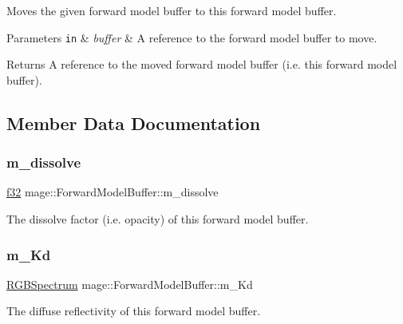 Moves the given forward model buffer to this forward model buffer.


\begin{DoxyParams}[1]{Parameters}
\mbox{\tt in}  & {\em buffer} & A reference to the forward model buffer to move. \\
\hline
\end{DoxyParams}
\begin{DoxyReturn}{Returns}
A reference to the moved forward model buffer (i.\+e. this forward model buffer). 
\end{DoxyReturn}


\subsection{Member Data Documentation}
\hypertarget{structmage_1_1_forward_model_buffer_a66aac36b793d38cff5dede6a683ff6a5}{}\label{structmage_1_1_forward_model_buffer_a66aac36b793d38cff5dede6a683ff6a5} 
\subsubsection{\texorpdfstring{m\+\_\+dissolve}{m\_dissolve}}
{\footnotesize\ttfamily \hyperlink{namespacemage_a6a44ad388483959dc4dff9f2aef91431}{f32} mage\+::\+Forward\+Model\+Buffer\+::m\+\_\+dissolve}

The dissolve factor (i.\+e. opacity) of this forward model buffer. \hypertarget{structmage_1_1_forward_model_buffer_aed51188d71fc18b4e6f62f0834d6aca9}{}\label{structmage_1_1_forward_model_buffer_aed51188d71fc18b4e6f62f0834d6aca9} 
\subsubsection{\texorpdfstring{m\+\_\+\+Kd}{m\_Kd}}
{\footnotesize\ttfamily \hyperlink{structmage_1_1_r_g_b_spectrum}{R\+G\+B\+Spectrum} mage\+::\+Forward\+Model\+Buffer\+::m\+\_\+\+Kd}

The diffuse reflectivity of this forward model buffer. \hypertarget{structmage_1_1_forward_model_buffer_a8a5ccfc750ad2142c97d82545196b1e8}{}\label{structmage_1_1_forward_model_buffer_a8a5ccfc750ad2142c97d82545196b1e8} 
